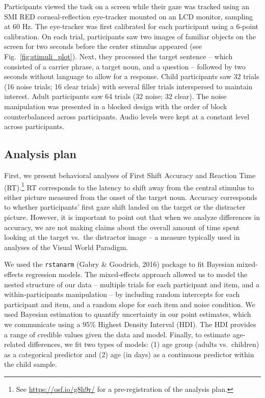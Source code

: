 \documentclass[10pt, letterpaper]{article}
\begin{document}
Participants viewed the task on a screen while their gaze was tracked
using an SMI RED corneal-reflection eye-tracker mounted on an LCD
monitor, sampling at 60 Hz. The eye-tracker was first calibrated for
each participant using a 6-point calibration. On each trial,
participants saw two images of familiar objects on the screen for two
seconds before the center stimulus appeared (see
Fig.~\ref{fig:stimuli_plot}). Next, they processed the target sentence
-- which consisted of a carrier phrase, a target noun, and a question --
followed by two seconds without language to allow for a response. Child
participants saw 32 trials (16 noise trials; 16 clear trials) with
several filler trials interspersed to maintain interest. Adult
participants saw 64 trials (32 noise; 32 clear). The noise manipulation
was presented in a blocked design with the order of block
counterbalanced across participants. Audio levels were kept at a
constant level across participants.

\hypertarget{analysis-plan}{%
\subsection{Analysis plan}\label{analysis-plan}}

First, we present behavioral analyses of First Shift Accuracy and
Reaction Time (RT).\footnote{See \url{https://osf.io/g8h9r/} for a
  pre-registration of the analysis plan.} RT corresponds to the latency
to shift away from the central stimulus to either picture measured from
the onset of the target noun. Accuracy corresponds to whether
participants' first gaze shift landed on the target or the distracter
picture. However, it is important to point out that when we analyze
differences in accuracy, we are not making claims about the overall
amount of time spent looking at the target vs.~the distractor image -- a
measure typically used in analyses of the Visual World Paradigm.

We used the \texttt{rstanarm} (Gabry \& Goodrich, 2016) package to fit
Bayesian mixed-effects regression models. The mixed-effects approach
allowed us to model the nested structure of our data -- multiple trials
for each participant and item, and a within-participants manipulation --
by including random intercepts for each participant and item, and a
random slope for each item and noise condition. We used Bayesian
estimation to quantify uncertainty in our point estimates, which we
communicate using a 95\% Highest Density Interval (HDI). The HDI
provides a range of credible values given the data and model. Finally,
to estimate age-related differences, we fit two types of models: (1) age
group (adults vs.~children) as a categorical predictor and (2) age (in
days) as a continuous predictor within the child sample.
\end{document}
